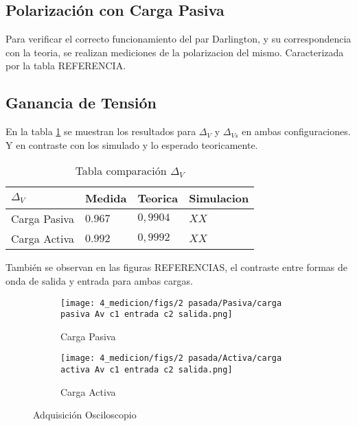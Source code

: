 \subsection{Polarización con Carga Pasiva}

Para verificar el correcto funcionamiento del par Darlington, y su correspondencia con la teoria, se realizan mediciones de la polarizacion del mismo. Caracterizada por la tabla REFERENCIA.



\subsection{Ganancia de Tensión}

En la tabla \ref{table:comp av} se muestran los resultados para $\Delta_V$ y $\Delta_{Vs}$ en ambas configuraciones. Y en contraste con los simulado y lo esperado teoricamente.



\begin{table}[ht]
    \centering
    \begin{tabular}{|l|l|l|l|}
    \hline
    $\Delta_V $  & Medida   & Teorica  & Simulacion \\ \hline
    Carga Pasiva & $0.967$  & $0,9904$ &  $XX$       \\ \hline
    Carga Activa & $0.992$  & $0,9992$ &  $XX$          \\ \hline
    \end{tabular}
    \caption{Tabla comparación $\Delta_V$}\label{table:comp av}
\end{table}

También se observan en las figuras REFERENCIAS, el contraste entre formas de onda de salida y entrada para ambas cargas.



\begin{figure}[ht]
\begin{subfigure}{.45\textwidth}
  \centering
  \texttt{[image: 4\_medicion/figs/2 pasada/Pasiva/carga pasiva Av c1 entrada c2 salida.png]}  
  \caption{Carga Pasiva}
  \label{fig:Av carga pasiva}
\end{subfigure}
\begin{subfigure}{.45\textwidth}
  \centering
  \texttt{[image: 4\_medicion/figs/2 pasada/Activa/carga activa Av c1 entrada c2 salida.png]}  
  \caption{Carga Activa}
  \label{fig:Av carga activa}
\end{subfigure}
\caption{Adquisición Osciloscopio}
\label{fig:Av oscilo}
\end{figure}

